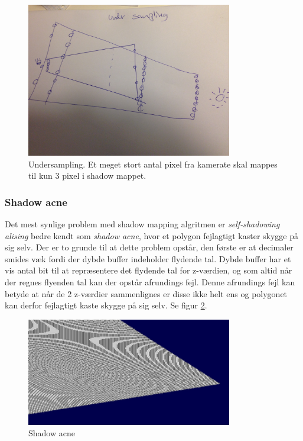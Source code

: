 \documentclass[11pt,a4paper]{article}
\begin{document}
\begin{figure}[ht!]
\centering
\includegraphics[width=90mm]{img/P2.jpg}
\caption{Undersampling. Et meget stort antal pixel fra kamerate skal mappes til kun 3 pixel i shadow mappet.}
\label{P2}
\end{figure}


\subsubsection{Shadow acne}

Det mest synlige problem med shadow mapping algritmen er \textit{self-shadowing alising} bedre kendt som \textit{shadow acne}, hvor et  polygon fejlagtigt kaster skygge på sig selv. Der er to grunde til at dette problem opstår, den første  er at decimaler smides væk fordi der dybde buffer indeholder flydende tal. Dybde buffer har et vis antal bit til at repræsentere det flydende tal for z-værdien,  og som altid når der regnes flyenden tal kan der opstår afrundings fejl. Denne afrundings fejl kan betyde at når de 2 z-værdier sammenlignes er disse ikke helt ens og polygonet kan derfor fejlagtigt kaste skygge på sig selv.  Se figur \ref{S0}.

\begin{figure}[ht!]
\centering
\includegraphics[width=90mm]{img/S0.png}
\caption{Shadow acne}
\label{S0}
\end{figure}
\end{document}
